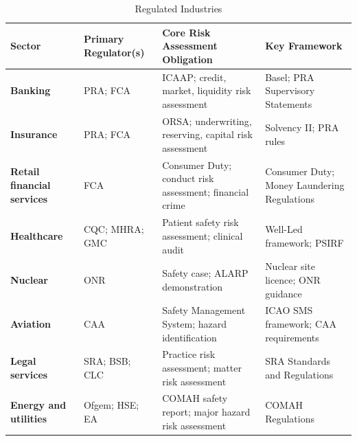 \begin{table}[H]
  \centering
  \renewcommand{\arraystretch}{1.5}
  \begin{tabularx}{\textwidth}{ | >{\raggedright\arraybackslash}p{} 
								| >{\raggedright\arraybackslash}p{} 
								| >{\raggedright\arraybackslash}p{} 
                                | >{\raggedright\arraybackslash}X | }
    \hline
    \textbf{Sector} & \textbf{Primary Regulator(s)} & \textbf{Core Risk Assessment Obligation} & \textbf{Key Framework} \\
    \hline
    \textbf{Banking} & PRA; FCA & ICAAP; credit, market, liquidity risk assessment & Basel; PRA Supervisory Statements\\
    \hline
    \textbf{Insurance} & PRA; FCA & ORSA; underwriting, reserving, capital risk assessment & Solvency II; PRA rules\\
    \hline
    \textbf{Retail financial services} & FCA & Consumer Duty; conduct risk assessment; financial crime & Consumer Duty; Money Laundering Regulations\\
    \hline
    \textbf{Healthcare} & CQC; MHRA; GMC & Patient safety risk assessment; clinical audit & Well-Led framework; PSIRF\\
    \hline
    \textbf{Nuclear} & ONR & Safety case; ALARP demonstration & Nuclear site licence; ONR guidance\\
    \hline
    \textbf{Aviation} & CAA & Safety Management System; hazard identification & ICAO SMS framework; CAA requirements\\
    \hline
    \textbf{Legal services} & SRA; BSB; CLC & Practice risk assessment; matter risk assessment & SRA Standards and Regulations\\
    \hline
    \textbf{Energy and utilities} & Ofgem; HSE; EA & COMAH safety report; major hazard risk assessment & COMAH Regulations\\
    \hline
  \end{tabularx}
  \caption{Regulated Industries}
\end{table}

